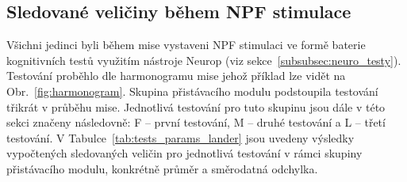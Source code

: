 \subsection{Sledované veličiny během NPF stimulace}
\label{sec:result_cog_tests}
Všichni jedinci byli během mise vystaveni \gls{NPF} stimulaci ve formě baterie
kognitivních testů využitím nástroje Neurop (viz
sekce~\ref{subsubsec:neuro_testy}). Testování proběhlo dle harmonogramu mise
jehož příklad lze vidět na Obr.~\ref{fig:harmonogram}. Skupina přistávacího
modulu podstoupila testování třikrát v průběhu mise. Jednotlivá testování pro
tuto skupinu jsou dále v této sekci značeny následovně: F -- první testování, M
-- druhé testování a L -- třetí testování. V
Tabulce~\ref{tab:tests_params_lander} jsou uvedeny výsledky vypočtených
sledovaných veličin pro jednotlivá testování v rámci skupiny přistávacího
modulu, konkrétně průměr a směrodatná odchylka.

